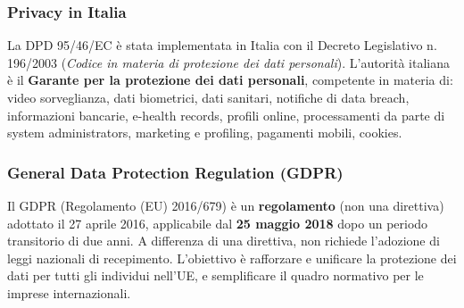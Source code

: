 \documentclass[a4paper,11pt]{article}
\begin{document}
\subsubsection{Privacy in Italia}

La DPD 95/46/EC \`{e} stata implementata in Italia con il Decreto Legislativo n. 196/2003 (\emph{Codice in materia di protezione dei dati personali}). L'autorit\`{a} italiana \`{e} il \textbf{Garante per la protezione dei dati personali}, competente in materia di:
video sorveglianza, dati biometrici, dati sanitari, notifiche di data breach, informazioni bancarie, e-health records, profili online, processamenti da parte di system administrators, marketing e profiling, pagamenti mobili, cookies.

\subsubsection{General Data Protection Regulation (GDPR)}

\begin{definizione}[GDPR]
Il GDPR (Regolamento (EU) 2016/679) \`{e} un \textbf{regolamento} (non una direttiva) adottato il 27 aprile 2016, applicabile dal \textbf{25 maggio 2018} dopo un periodo transitorio di due anni. A differenza di una direttiva, non richiede l'adozione di leggi nazionali di recepimento. L'obiettivo \`{e} rafforzare e unificare la protezione dei dati per tutti gli individui nell'UE, e semplificare il quadro normativo per le imprese internazionali.
\end{definizione}
\end{document}
